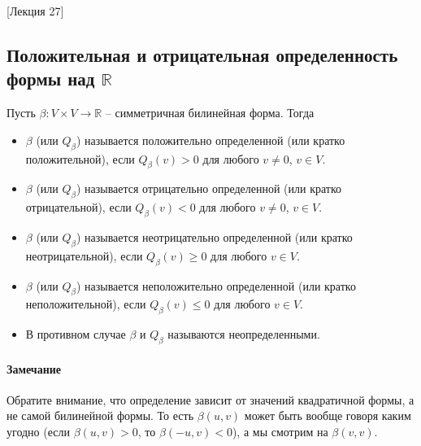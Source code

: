 [Лекция 27]


\subsection{Положительная и отрицательная определенность формы над $\mathbb R$}

\begin{definition}
Пусть $\beta\colon V\times V\to \mathbb R$ -- симметричная билинейная форма. Тогда
\begin{itemize}
\item $\beta$ (или $Q_\beta$) называется положительно определенной (или кратко положительной), если $Q_\beta(v) > 0$ для любого $v\neq 0$, $v\in V$.

\item $\beta$ (или $Q_\beta$) называется отрицательно определенной (или кратко отрицательной), если $Q_\beta(v) < 0$ для любого $v\neq 0$, $v\in V$.

\item $\beta$ (или $Q_\beta$) называется неотрицательно определенной (или кратко неотрицательной), если $Q_\beta(v) \geqslant 0$ для любого $v\in V$.

\item $\beta$ (или $Q_\beta$) называется неположительно определенной (или кратко неположительной), если $Q_\beta(v) \leqslant 0$ для любого $v\in V$.

\item В противном случае $\beta$ и $Q_\beta$ называются неопределенными.
\end{itemize}
\end{definition}

\paragraph{Замечание} Обратите внимание, что определение зависит от значений квадратичной формы, а не самой билинейной формы. То есть $\beta(u,v)$ может быть вообще говоря каким угодно (если $\beta(u, v) >0$, то $\beta(-u, v)< 0$), а мы смотрим на $\beta(v, v)$.

